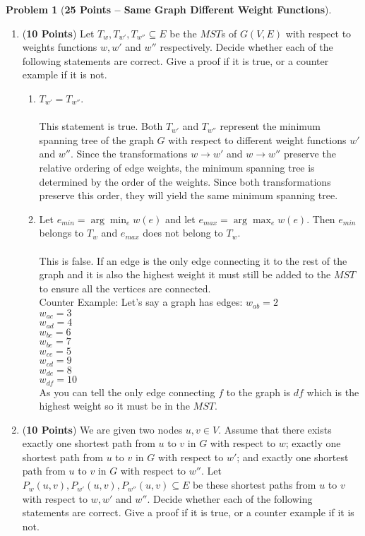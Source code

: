 \documentclass[11pt]{article}
\theoremstyle{definition}
\theoremstyle{theorem}
\newtheorem{prob}{Problem}
\begin{document}
\begin{prob}[\textbf{25 Points -- Same Graph Different Weight Functions}]
\begin{enumerate}
    \item  (\textbf{10 Points}) Let  $T_w,T_{w'},T_{w''}\subseteq  E$   be  the  $MST$s  of
      $G(V,E)$ with respect to weights functions $w,w'$  and $w''$ respectively.  Decide whether each
      of the following  statements are correct. Give a proof  if it is
      true, or a counter example if it is not.

      \begin{enumerate}
        \item $T_{w'} = T_{w''}$. \\\\
        This statement is true. Both $T_{w'}$ and $T_{w''}$ represent the minimum spanning tree of the graph $G$ with respect to different weight functions $w'$ and $w''$. Since the transformations $w \rightarrow w'$ and $w \rightarrow w''$ preserve the relative ordering of edge weights, the minimum spanning tree is determined by the order of the weights. Since both transformations preserve this order, they will yield the same minimum spanning tree.

    \newpage
    
        \item Let $e_{min} = \arg\min_{e} w(e)$ and let $e_{max} = \arg\max_{e} w(e)$. Then $e_{min}$ belongs to $T_w$ and $e_{max}$ does not belong to $T_w$. \\\\
        This is false. If an edge is the only edge connecting it to the rest of the graph and it is also the highest weight it must still be added to the $MST$ to ensure all the vertices are connected. \\
        Counter Example:
        Let's say a graph has edges:
        $w_{ab}=2$ \\
        $w_{ac}=3$ \\
        $w_{ad}=4$ \\
        $w_{bc}=6$ \\
        $w_{be}=7$ \\
        $w_{ce}=5$ \\
        $w_{cd}=9$ \\
        $w_{de}=8$ \\
        $w_{df}=10$ \\
        As you can tell the only edge connecting $f$ to the graph is $df$ which is the highest weight so it must be in the $MST$.

      \end{enumerate}

    \item (\textbf{10 Points}) We are given two nodes $u,v\in V$. Assume that there exists exactly one shortest path from $u$ to $v$ in $G$ with respect to $w$; exactly one shortest path from $u$ to $v$ in $G$ with respect to $w'$; and exactly one shortest path from $u$ to $v$ in $G$ with respect to $w''$. Let $P_w(u,v),P_{w'}(u,v),P_{w''}(u,v)\subseteq E$ be these shortest paths from $u$ to $v$ with respect to $w,w'$ and $w''$. Decide whether each of the following statements are correct. Give a proof if it is true, or a counter example if it is not.



\end{enumerate}
\end{prob}
\end{document}
